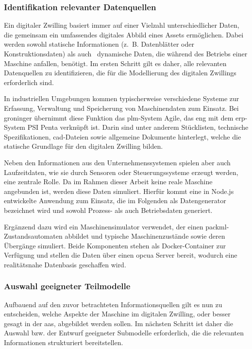 \subsubsection{Identifikation relevanter Datenquellen}
Ein digitaler Zwilling basiert immer auf einer Vielzahl unterschiedlicher Daten, die gemeinsam ein umfassendes digitales Abbild eines Assets ermöglichen. 
Dabei werden sowohl statische Informationen (z.~B. Datenblätter oder Konstruktionsdaten) als auch%
\pagebreak
~dynamische Daten, die während des Betriebs einer Maschine anfallen, benötigt.
Im ersten Schritt gilt es daher, alle relevanten Datenquellen zu identifizieren, die für die Modellierung des digitalen Zwillings erforderlich sind.

In industriellen Umgebungen kommen typischerweise verschiedene Systeme zur Erfassung, Verwaltung und Speicherung von Maschinendaten zum Einsatz.
Bei groninger übernimmt diese Funktion das \acs{plm}-System Agile, das eng mit dem \acs{erp}-System PSI Penta verknüpft ist.
Darin sind unter anderem Stücklisten, technische Spezifikationen, \acs{cad}-Dateien sowie allgemeine Dokumente hinterlegt, welche die statische Grundlage für den digitalen Zwilling bilden.

Neben den Informationen aus den Unternehmenssystemen spielen aber auch Laufzeitdaten, wie sie durch Sensoren oder Steuerungssysteme erzeugt werden, eine zentrale Rolle.
Da im Rahmen dieser Arbeit keine reale Maschine angebunden ist, werden diese Daten simuliert.
Hierfür kommt eine in Node.js entwickelte Anwendung zum Einsatz, die im Folgenden als Datengenerator bezeichnet wird und sowohl Prozess- als auch Betriebsdaten generiert. 

Ergänzend dazu wird ein Maschinensimulator verwendet, der einen \ac{packml}-Zustands\-automaten abbildet und typische Maschinenzustände sowie deren Übergänge simuliert. 
Beide Komponenten stehen als Docker-Container zur Verfügung und stellen die Daten über einen \acs{opcua} Server bereit, wodurch eine realitätsnahe Datenbasis geschaffen wird.
\subsubsection{Auswahl geeigneter Teilmodelle}
Aufbauend auf den zuvor betrachteten Informationsquellen gilt es nun zu entscheiden, welche Aspekte der Maschine im digitalen Zwilling, oder besser gesagt in der \acs{aas}, abgebildet werden sollen.
Im nächsten Schritt ist daher die Auswahl bzw. der Entwurf geeigneter Submodelle erforderlich, die die relevanten Informationen strukturiert bereitstellen.


